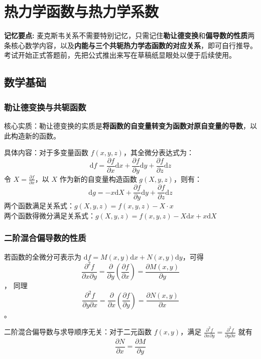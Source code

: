 \documentclass{article}
\begin{document}
	\section{热力学函数与热力学系数}
	
	\textbf{记忆要点:}
	麦克斯韦关系不需要特别记忆，只需记住\textbf{勒让德变换}和\textbf{偏导数的性质}两条核心数学内容，以及\textbf{内能与三个共轭热力学态函数的对应关系}，即可自行推导。考试开始正式答题前，先把公式推出来写在草稿纸显眼处以便于后续使用。
	\subsection{数学基础}
	
	\subsubsection{勒让德变换与共轭函数}
	核心实质：勒让德变换的实质是\textbf{将函数的自变量转变为函数对原自变量的导数}，以此构造新的函数。
	
	具体内容：对于多变量函数 $f(x,y,z)$，其全微分表达式为：
	\[
	\mathrm{d}f=\frac{\partial f}{\partial x}\mathrm{d}x+\frac{\partial f}{\partial y}\mathrm{d}y+\frac{\partial f}{\partial z}\mathrm{d}z
	\]
	令 $X=\frac{\partial f}{\partial x}$，以 $X$ 作为新的自变量构造函数 $g(X,y,z)$，则有：
	\[
	\mathrm{d}g=-x\mathrm{d}X+\frac{\partial f}{\partial y}\mathrm{d}y+\frac{\partial f}{\partial z}\mathrm{d}z
	\]
	两个函数满足关系式：$g(X,y,z)=f(x,y,z)-X\cdot x$ \\
	两个函数得微分满足关系式：$g(X,y,z)=f(x,y,z)-X\mathrm{d}x + x\mathrm{d}X$
	
	\subsubsection{二阶混合偏导数的性质}
	若函数的全微分可表示为 $\mathrm{d}f = M(x,y)\mathrm{d}x+N(x,y)\mathrm{d}y$，可得 
	$$\frac{\partial^2 f}{\partial x\partial y}=\frac{\partial }{\partial y}\left(\frac{\partial f}{\partial x}\right)=\frac{\partial M(x,y)}{\partial y}$$，
	同理 $$\frac{\partial^2 f}{\partial y\partial x}=\frac{\partial }{\partial x}\left(\frac{\partial f}{\partial y}\right)=\frac{\partial N(x,y)}{\partial x}$$。
	
	二阶混合偏导数与求导顺序无关：对于二元函数 $f(x,y)$，满足
	$
	\frac{\partial^2 f}{\partial x\partial y}=\frac{\partial^2 f}{\partial y\partial x}
	$
	就有 $$\frac{\partial N}{\partial x}=\frac{\partial M}{\partial y}$$
	
\end{document}
